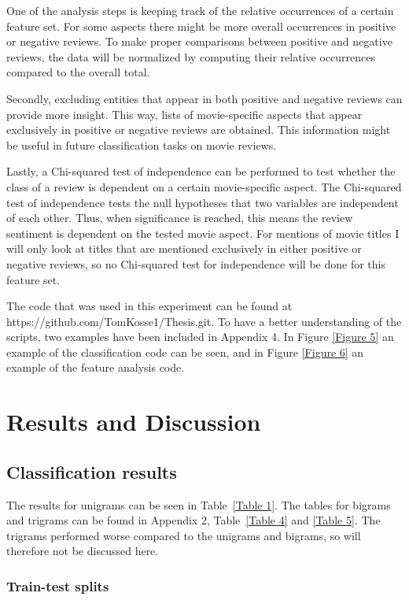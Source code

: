 \documentclass[
10pt, %
a4paper, %
oneside, %
headinclude,footinclude, %
] {book}%
\begin{document}
One of the analysis steps is keeping track of the relative occurrences of a certain feature set. For some aspects there might be more overall occurrences in positive or negative reviews. To make proper comparisons between positive and negative reviews, the data will be normalized by computing their relative occurrences compared to the overall total. 

Secondly, excluding entities that appear in both positive and negative reviews can provide more insight. This way, lists of movie-specific aspects that appear exclusively in positive or negative reviews are obtained. This information might be useful in future classification tasks on movie reviews.

Lastly, a Chi-squared test of independence can be performed to test whether the class of a review is dependent on a certain movie-specific aspect. The Chi-squared test of independence tests the null hypotheses that two variables are independent of each other. Thus, when significance is reached, this means the review sentiment is dependent on the tested movie aspect. For mentions of movie titles I will only look at titles that are mentioned exclusively in either positive or negative reviews, so no Chi-squared test for independence will be done for this feature set.

The code that was used in this experiment can be found at \\
https://github.com/TomKosse1/Thesis.git. To have a better understanding of the scripts, two examples have been included in Appendix 4. In Figure \ref{Figure 5} an example of the classification code can be seen, and in Figure \ref{Figure 6} an example of the feature analysis code.

\chapter{Results and Discussion}

\section{Classification results}

The results for unigrams can be seen in Table~\ref{Table 1}. The tables for bigrams and trigrams can be found in Appendix 2, Table~\ref{Table 4} and \ref{Table 5}. The trigrams performed worse compared to the unigrams and bigrams, so will therefore not be discussed here.

\subsection{Train-test splits}
\end{document}
